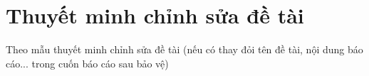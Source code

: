 \chapter*{Thuyết minh chỉnh sửa đề tài}
\label{thanks}

Theo mẫu thuyết minh chỉnh sửa đề tài (nếu có thay đỏi tên đề tài, nội dung báo cáo... trong cuốn báo cáo sau bảo vệ)